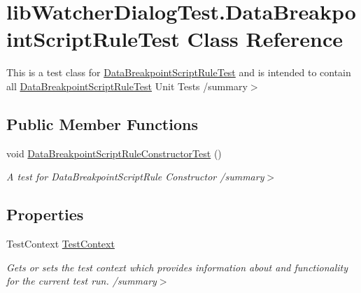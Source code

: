 \hypertarget{classlib_watcher_dialog_test_1_1_data_breakpoint_script_rule_test}{\section{lib\+Watcher\+Dialog\+Test.\+Data\+Breakpoint\+Script\+Rule\+Test Class Reference}
\label{classlib_watcher_dialog_test_1_1_data_breakpoint_script_rule_test}
}


This is a test class for \hyperlink{classlib_watcher_dialog_test_1_1_data_breakpoint_script_rule_test}{Data\+Breakpoint\+Script\+Rule\+Test} and is intended to contain all \hyperlink{classlib_watcher_dialog_test_1_1_data_breakpoint_script_rule_test}{Data\+Breakpoint\+Script\+Rule\+Test} Unit Tests /summary$>$  


\subsection*{Public Member Functions}
\begin{DoxyCompactItemize}
\item 
\hypertarget{classlib_watcher_dialog_test_1_1_data_breakpoint_script_rule_test_a3098ef07e4bd4709bf26b1f678ece028}{void \hyperlink{classlib_watcher_dialog_test_1_1_data_breakpoint_script_rule_test_a3098ef07e4bd4709bf26b1f678ece028}{Data\+Breakpoint\+Script\+Rule\+Constructor\+Test} ()}\label{classlib_watcher_dialog_test_1_1_data_breakpoint_script_rule_test_a3098ef07e4bd4709bf26b1f678ece028}

\begin{DoxyCompactList}\small\item\em A test for Data\+Breakpoint\+Script\+Rule Constructor /summary$>$ \end{DoxyCompactList}\end{DoxyCompactItemize}
\subsection*{Properties}
\begin{DoxyCompactItemize}
\item 
\hypertarget{classlib_watcher_dialog_test_1_1_data_breakpoint_script_rule_test_acb41f1e85a143fd9dea6709020003409}{Test\+Context \hyperlink{classlib_watcher_dialog_test_1_1_data_breakpoint_script_rule_test_acb41f1e85a143fd9dea6709020003409}{Test\+Context}}\label{classlib_watcher_dialog_test_1_1_data_breakpoint_script_rule_test_acb41f1e85a143fd9dea6709020003409}

\begin{DoxyCompactList}\small\item\em Gets or sets the test context which provides information about and functionality for the current test run. /summary$>$ \end{DoxyCompactList}\end{DoxyCompactItemize}


